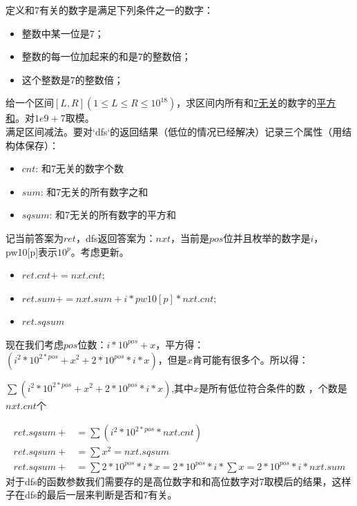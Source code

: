 定义和7有关的数字是满足下列条件之一的数字：
\begin{itemize}
\item 整数中某一位是7；
\item 整数的每一位加起来的和是7的整数倍；
\item 这个整数是7的整数倍；
\end{itemize}
给一个区间$[L,R](1\leq L\leq R\leq 10^{18})$，求区间内所有和\underline {7无关}的数字的\underline {平方和}。对$1e9+7$取模。 \\
满足区间减法。要对`dfs`的返回结果（低位的情况已经解决）记录三个属性（用结构体保存）：
\begin{itemize}
\item $cnt$: 和7无关的数字个数
\item $sum$: 和7无关的所有数字之和
\item $sqsum$: 和7无关的所有数字的平方和
\end{itemize}
记当前答案为$ret$，dfs返回答案为：$nxt$，当前是$pos$位并且枚举的数字是$i$，pw10[p]表示$10^{p}$。考虑更新。
\begin{itemize}
\item  $ret.cnt+=nxt.cnt;$
\item  $ret.sum+=nxt.sum+i*pw10[p]*nxt.cnt;$
\item  $ret.sqsum$
\end{itemize}
现在我们考虑$pos$位数：$i*10^{pos}+x$，平方得：$(i^{2}*10^{2*pos}+x^2+2*10^{pos}*i*x)$，但是$x$肯可能有很多个。所以得： \\
\begin{center}
$\sum{(i^{2}*10^{2*pos}+x^2+2*10^{pos}*i*x)}$,其中$x$是所有低位符合条件的数 ，个数是$nxt.cnt$个
\end{center}
$$\begin{aligned}
ret.sqsum+ &=\sum (i^{2}*10^{2*pos}*nxt.cnt)\\
ret.sqsum+ &=\sum x^{2}=nxt.sqsum \\
ret.sqsum+ &=\sum 2*10^{pos}*i*x= 2*10^{pos}*i*\sum x=2*10^{pos}*i*nxt.sum
\end{aligned}$$
对于dfs的函数参数我们需要存的是高位数字和和高位数字对7取模后的结果，这样子在dfs的最后一层来判断是否和7有关。
